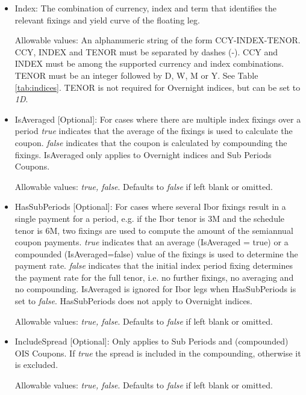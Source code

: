 \begin{itemize}
\item Index:  The combination of currency, index and term that
  identifies the relevant fixings and yield curve of the floating leg.

  Allowable values: An alphanumeric string of the form CCY-INDEX-TENOR. CCY, INDEX and TENOR must be separated by dashes (-). CCY and INDEX must be among the supported currency and index combinations. TENOR must be an integer followed by D, W,
  M or Y. See Table \ref{tab:indices}. TENOR is not required for Overnight indices, but can be set to \emph{1D}.

\item IsAveraged [Optional]:  For cases where there are multiple index fixings over a period \emph{true} indicates that
  the average of the fixings is used to calculate the coupon.  \emph{false} indicates that the coupon is calculated by
  compounding the fixings.  IsAveraged only applies to Overnight indices and Sub Periods Coupons.

Allowable values:  \emph{true, false}. Defaults to \emph{false} if left blank or omitted.

\item HasSubPeriods [Optional]: For cases where several Ibor fixings result in a single payment for a period, e.g. if
  the Ibor tenor is 3M and the schedule tenor is 6M, two fixings are used to compute the amount of the semiannual coupon
  payments. \emph{true} indicates that an average (IsAveraged = true) or a compounded (IsAveraged=false) value of the
  fixings is used to determine the payment rate.  \emph{false} indicates that the initial index period fixing determines the payment rate for the
  full tenor, i.e. no further fixings, no averaging and no compounding. IsAveraged is ignored for Ibor legs when HasSubPeriods is set to  \emph{false}.
  HasSubPeriods does not apply to Overnight indices.

Allowable values:  \emph{true, false}. Defaults to \emph{false} if left blank or omitted.

\item IncludeSpread [Optional]: Only applies to Sub Periods and (compounded) OIS Coupons. If \emph{true} the spread is
  included in the compounding, otherwise it is excluded.

Allowable values:  \emph{true, false}. Defaults to \emph{false} if left blank or omitted.


\end{itemize}
